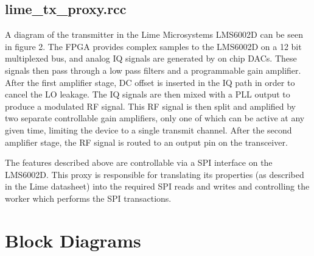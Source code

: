 \documentclass{article}
\def\comp{lime\_tx\_proxy}
\begin{document}
\subsection*{\comp.rcc}
A diagram of the transmitter in the Lime Microsystems LMS6002D can be seen in figure 2. The FPGA provides complex samples to the LMS6002D on a 12 bit multiplexed bus, and analog IQ signals are generated by on chip DACs. These signals then pass through a low pass filters and a programmable gain amplifier. After the first amplifier stage, DC offset is inserted in the IQ path in order to cancel the LO leakage. The IQ signals are then mixed with a PLL output to produce a modulated RF signal. This RF signal is then split and amplified by two separate controllable gain amplifiers, only one of which can be active at any given time, limiting the device to a single transmit channel. After the second amplifier stage, the RF signal is routed to an output pin on the transceiver.\par\bigskip
\noindent The features described above are controllable via a SPI interface on the LMS6002D. This proxy is responsible for translating its properties (as described in the Lime datasheet) into the required SPI reads and writes and controlling the worker which performs the SPI transactions.
\newpage

\section*{Block Diagrams}
\end{document}
